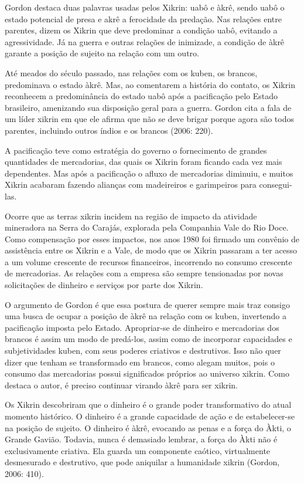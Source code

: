 Gordon destaca duas palavras usadas pelos Xikrin: uabô e àkrê, sendo
uabô o estado potencial de presa e akrê a ferocidade da predação. Nas
relações entre parentes, dizem os Xikrin que deve predominar a condição
uabô, evitando a agressividade. Já na guerra e outras relações de
inimizade, a condição de àkrê garante a posição de sujeito na relação
com um outro. 

Até meados do século passado, nas relações com os kuben, os brancos,
predominava o estado àkrê. Mas, ao comentarem a história do contato, os
Xikrin reconhecem a predominância do estado uabô após a pacificação
pelo Estado brasileiro, amenizando sua disposição geral para a guerra.
Gordon cita a fala de um líder xikrin em que ele afirma que não se deve
brigar porque agora são todos parentes, incluindo outros índios e os
brancos (2006: 220). 

A pacificação teve como estratégia do governo o fornecimento de grandes
quantidades de mercadorias, das quais os Xikrin foram ficando cada vez
mais dependentes. Mas após a pacificação o afluxo de mercadorias
diminuiu, e muitos Xikrin acabaram fazendo alianças com madeireiros e
garimpeiros para consegui-las. 

Ocorre que as terras xikrin incidem na região de impacto da atividade
mineradora na Serra do Carajás, explorada pela Companhia Vale do Rio
Doce. Como compensação por esses impactos, nos anos 1980 foi firmado um
convênio de assistência entre os Xikrin e a Vale, de modo que os Xikrin
passaram a ter acesso a um volume crescente de recursos financeiros,
incorrendo no consumo crescente de mercadorias. As relações com a
empresa são sempre tensionadas por novas solicitações de dinheiro e
serviços por parte dos Xikrin. 

O argumento de Gordon é que essa postura de querer sempre mais traz
consigo uma busca de ocupar a posição de àkrê na relação com os kuben,
invertendo a pacificação imposta pelo Estado. Apropriar-se de dinheiro
e mercadorias dos brancos é assim um modo de predá-los, assim como de
incorporar capacidades e subjetividades kuben, com seus poderes
criativos e destrutivos. Isso não quer dizer que tenham se transformado
em brancos, como alegam muitos, pois o consumo das mercadorias possui
significados próprios ao universo xikrin. Como destaca o autor, é
preciso continuar virando àkrê para ser xikrin.

Os Xikrin descobriram que o dinheiro é o grande poder transformativo do
atual momento histórico. O dinheiro é a grande capacidade de ação e de
estabelecer-se na posição de sujeito. O dinheiro é àkrê, evocando as
penas e a força do Àkti, o Grande Gavião. Todavia, nunca é demasiado
lembrar, a força do Àkti não é exclusivamente criativa. Ela guarda um
componente caótico, virtualmente desmesurado e destrutivo, que pode
aniquilar a humanidade xikrin (Gordon, 2006: 410).

